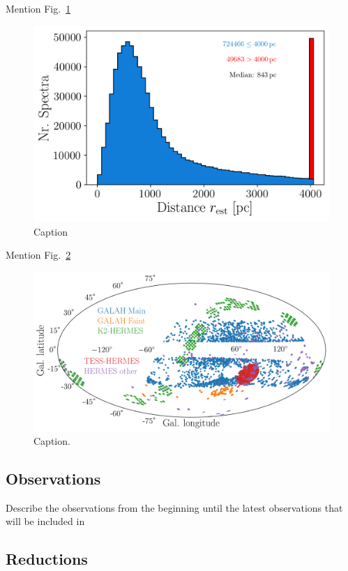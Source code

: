 \documentclass[fleqn,usenatbib,useAMS]{mnras}
\begin{document}
Mention Fig.~\ref{fig:distance}

\begin{figure}
  \includegraphics[width=\columnwidth]{figures/distance.png}
  \caption{Caption} 
  \label{fig:distance}
\end{figure}

Mention Fig.~\ref{fig:lb_overview_colored}

\begin{figure}
\centering
\includegraphics[width=\textwidth]{figures/lb_overview_colored.png}
\caption{Caption.}
\label{fig:lb_overview_colored}
\end{figure}

\subsection{Observations}

Describe the observations from the beginning until the latest observations that will be included in 

\subsection{Reductions}
\end{document}

